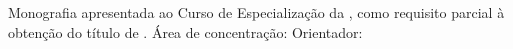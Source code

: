 \thispagestyle{empty}

\begin{center}
    \imprimirautor
\end{center}

\vspace{3cm}

\begin{center}
    \large \bfseries \imprimirtitulo
\end{center}

\vfill

\begin{flushright}
    \begin{minipage}[c]{.62\textwidth}
        Monografia apresentada ao Curso de Especialização da
        \imprimirinstituicao, como requisito parcial à obtenção do título de
        \pTitulacao.
        \newline \newline
        Área de concentração: \pAreaConcentracao
        \newline \newline
        Orientador: \imprimirorientador
    \end{minipage}
\end{flushright}

\vfill

\begin{center}
    {\imprimirlocal}

    {\imprimirinstituicao}

    {\imprimirdata}
\end{center}

